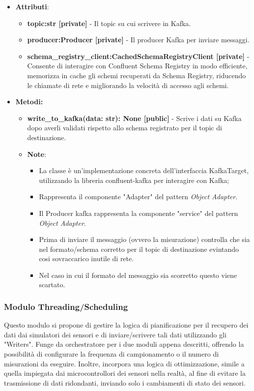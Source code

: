 \begin{itemize}
\begin{itemize}
    \item\textbf{Attributi}:
        \begin{itemize}
        \item \textbf{topic:str [private]} - Il topic su cui scrivere in Kafka.
        \item \textbf{producer:Producer [private]} - Il producer Kafka per inviare messaggi.
        \item \textbf{schema\_registry\_client:CachedSchemaRegistryClient [private]} - Consente di interagire con Confluent Schema Registry in modo efficiente, memorizza in cache gli schemi recuperati da Schema Registry, riducendo le chiamate di rete e migliorando la velocità di accesso agli schemi.
    \end{itemize}
    \item \textbf{Metodi: }
    \begin{itemize}
        \item \textbf{write\_to\_kafka(data: str): None [public]} - Scrive i dati su Kafka dopo averli validati rispetto allo schema registrato per il topic di destinazione.
    \item\textbf{Note}:
        \begin{itemize}
            \item La classe è un'implementazione concreta dell'interfaccia KafkaTarget, utilizzando la libreria confluent-kafka per interagire con Kafka;
            \item Rappresenta il componente "Adapter" del pattern \textit{Object Adapter}.
            \item Il Producer kafka rappresenta la componente "service" del pattern \textit{Object Adapter}.
            \item Prima di inviare il messaggio  (ovvero la misurazione) controlla che sia nel formato/schema corretto per il topic di destinazione evintando cosi sovraccarico inutile di rete.
            \item Nel caso in cui il formato del messaggio sia scorretto questo viene scartato.
        \end{itemize}
    \end{itemize}
\end{itemize}

\subsubsection{Modulo Threading/Scheduling}
Questo modulo si propone di gestire la logica di pianificazione per il recupero dei dati dai simulatori dei sensori e di inviare/scrivere tali dati utilizzando gli "Writers". Funge da orchestratore per i due moduli appena descritti, offrendo la possibilità di configurare la frequenza di campionamento o il numero di misurazioni da eseguire. Inoltre, incorpora una logica di ottimizzazione, simile a quella impiegata dai microcontrollori dei sensori nella realtà, al fine di evitare la trasmissione di dati ridondanti, inviando solo i cambiamenti di stato dei sensori.


\end{itemize}
